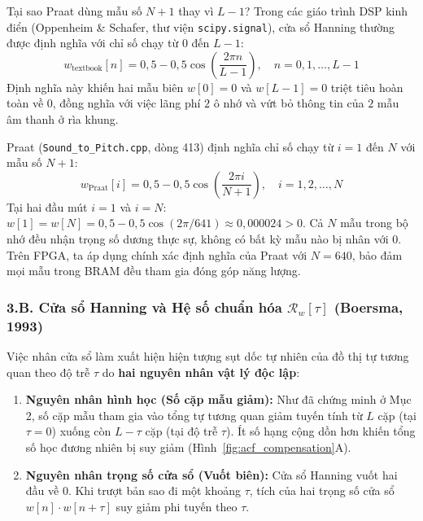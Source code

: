 \documentclass[11pt,a4paper]{article}
\begin{document}
\begin{enumerate}
    \begin{thoughtqa}{Tại sao Praat dùng mẫu số $N+1$ thay vì $L-1$?}
    Trong các giáo trình DSP kinh điển (Oppenheim \& Schafer, thư viện \texttt{scipy.signal}), cửa sổ Hanning thường được định nghĩa với chỉ số chạy từ $0$ đến $L-1$:
    \[
    w_{\text{textbook}}[n] = 0{,}5 - 0{,}5 \cos\left(\frac{2\pi n}{L - 1}\right), \quad n = 0, 1, \dots, L-1
    \]
    Định nghĩa này khiến hai mẫu biên $w[0] = 0$ và $w[L-1] = 0$ triệt tiêu hoàn toàn về $0$, đồng nghĩa với việc lãng phí $2$ ô nhớ và vứt bỏ thông tin của $2$ mẫu âm thanh ở rìa khung.
    
    Praat (\texttt{Sound\_to\_Pitch.cpp}, dòng 413) định nghĩa chỉ số chạy từ $i = 1$ đến $N$ với mẫu số $N + 1$:
    \[
    w_{\text{Praat}}[i] = 0{,}5 - 0{,}5 \cos\left(\frac{2\pi i}{N + 1}\right), \quad i = 1, 2, \dots, N
    \]
    Tại hai đầu mút $i = 1$ và $i = N$: $w[1] = w[N] = 0{,}5 - 0{,}5 \cos(2\pi / 641) \approx 0{,}000024 > 0$. Cả $N$ mẫu trong bộ nhớ đều nhận trọng số dương thực sự, không có bất kỳ mẫu nào bị nhân với $0$. Trên FPGA, ta áp dụng chính xác định nghĩa của Praat với $N = 640$, bảo đảm mọi mẫu trong BRAM đều tham gia đóng góp năng lượng.
    \end{thoughtqa}
\end{enumerate}

\subsubsection*{3.B. Cửa sổ Hanning và Hệ số chuẩn hóa $\mathcal{R}_w[\tau]$ (Boersma, 1993)}

Việc nhân cửa sổ làm xuất hiện hiện tượng sụt dốc tự nhiên của đồ thị tự tương quan theo độ trễ $\tau$ do \textbf{hai nguyên nhân vật lý độc lập}:
\begin{enumerate}
    \setlength{\itemsep}{0.5pt}
    \item \textbf{Nguyên nhân hình học (Số cặp mẫu giảm):} Như đã chứng minh ở Mục 2, số cặp mẫu tham gia vào tổng tự tương quan giảm tuyến tính từ $L$ cặp (tại $\tau = 0$) xuống còn $L - \tau$ cặp (tại độ trễ $\tau$). Ít số hạng cộng dồn hơn khiến tổng số học đương nhiên bị suy giảm (Hình~\ref{fig:acf_compensation}A).
    \item \textbf{Nguyên nhân trọng số cửa sổ (Vuốt biên):} Cửa sổ Hanning vuốt hai đầu về 0. Khi trượt bản sao đi một khoảng $\tau$, tích của hai trọng số cửa sổ $w[n] \cdot w[n+\tau]$ suy giảm phi tuyến theo $\tau$.
\end{enumerate}
\end{document}
